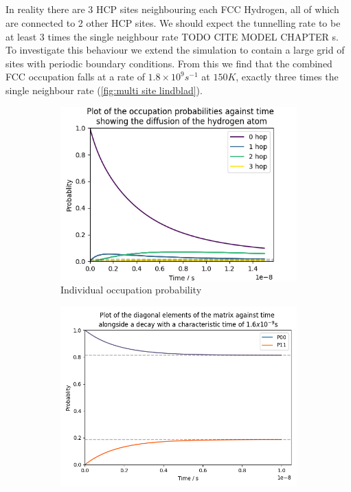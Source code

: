 \subsection{}
In reality there
are 3 HCP sites neighbouring
each FCC Hydrogen, all of which
are connected to 2 other HCP sites.
We should expect the tunnelling
rate to be at least
\(3\) times the single
neighbour rate TODO CITE MODEL CHAPTER s.
To investigate this behaviour we extend
the simulation to contain a large
grid of sites with periodic boundary conditions.
From this we find that the combined FCC occupation
falls at a rate of
\(1.8\times{}10^{9}s^{-1}\) at
\(150K\), exactly
three times the single neighbour rate (\cref{fig:multi site lindblad}).
\begin{figure}[htbp]
    \centering
    \begin{subfigure}{0.45\linewidth}
        \centering
        \includegraphics[width =0.9 \linewidth]{Figures/Redfield/Plot of lindblad solution many sites.png}
        \caption{Individual occupation probability
        }\label{sub@fig:multi site lindblad}
    \end{subfigure}
    \hfill
    \begin{subfigure}{0.45\linewidth}
        \centering
        \includegraphics[width = 0.9\linewidth]{Figures/Redfield/Plot of redfield solution long time.png}

\end{subfigure}
\end{figure}
